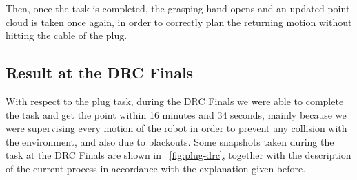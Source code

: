 		Then, once the task is completed, the grasping hand opens and an updated point cloud is taken once again,
		in order to correctly plan the returning motion without hitting the cable of the plug.
		
	\subsection{Result at the DRC Finals}
		
		
		
		With respect to the plug task, during the DRC Finals we were able to complete the task
		and get the point	within 16 minutes and 34 seconds, mainly because we were supervising
		every motion of the robot in order to prevent any collision with the environment, and
		also due to blackouts.
		Some snapshots taken during the task at the DRC Finals are shown in
		\figurename~\ref{fig:plug-drc}, together with the description of the current process
		in accordance with the explanation given before.
		
